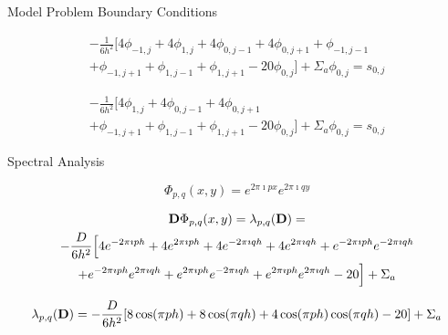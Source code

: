 \documentclass{beamer}
\begin{document}
\begin{frame}{Model Problem Boundary Conditions}

\begin{multline}
  -\frac{1}{6h^2}[4 \phi_{-1,j} + 4 \phi_{1,j} + 4 \phi_{0,j-1} + 4
    \phi_{0,j+1} + \phi_{-1,j-1}\\ + \phi_{-1,j+1} + \phi_{1,j-1} +
    \phi_{1,j+1} - 20 \phi_{0,j}] + \Sigma_a \phi_{0,j} = s_{0,j}
  \label{eq:x_min_bnd}
\end{multline}

\begin{multline}
  -\frac{1}{6h^2}[4 \phi_{1,j} + 4 \phi_{0,j-1} + 4 \phi_{0,j+1} \\ +
    \phi_{-1,j+1} + \phi_{1,j-1} + \phi_{1,j+1} - 20 \phi_{0,j}] +
  \Sigma_a \phi_{0,j} = s_{0,j}
  \label{eq:x_min_bnd_2}
\end{multline}

\end{frame}

\begin{frame}{Spectral Analysis}

\begin{equation}
  \Phi_{p,q}(x,y) = e^{2 \pi \imath p x} e^{2 \pi \imath q y}
  \label{eq:eigenfunction_form}
\end{equation}

\begin{multline}
  \mathbf{D}\Phi_{p,q}(x,y) = \lambda_{p,q}(\mathbf{D})
  =\\ -\frac{D}{6h^2}\Big[4 e^{-2 \pi \imath p h} + 4 e^{2 \pi \imath
      p h} + 4 e^{-2 \pi \imath q h} + 4 e^{2 \pi \imath q h} + e^{-2
      \pi \imath p h} e^{-2 \pi \imath q h} \\ + e^{-2 \pi \imath p h}
    e^{2 \pi \imath q h} + e^{2 \pi \imath p h} e^{-2 \pi \imath q h}
    + e^{2 \pi \imath p h} e^{2 \pi \imath q h} - 20\Big] + \Sigma_a
  \label{eq:deriv_diff_1}
\end{multline}

\begin{equation}
  \lambda_{p,q}(\mathbf{D}) = -\frac{D}{6h^2}[ 8 \cos(\pi p h) + 8
    \cos(\pi q h) + 4 \cos(\pi p h) \cos(\pi q h) - 20] + \Sigma_a
  \label{eq:deriv_diff_2}
\end{equation}

\end{frame}
\end{document}
